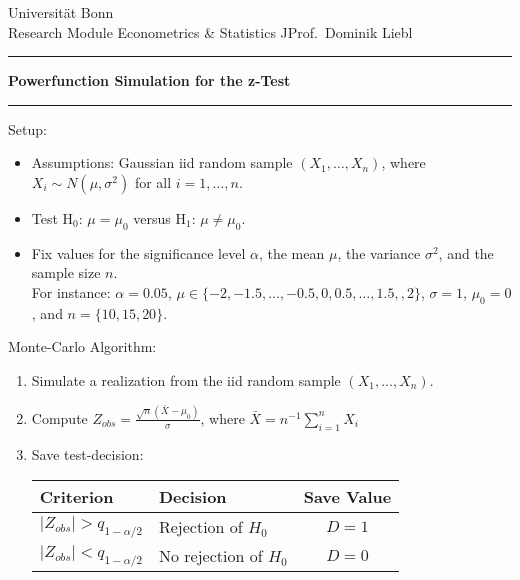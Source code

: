 \documentclass[a4paper]{article}
\begin{document}
Universität Bonn \hfill   \\%
Research Module Econometrics \& Statistics \hfill JProf.~Dominik Liebl
\rule{\textwidth}{.2pt}
\begin{center} 
\textbf{{\large Powerfunction Simulation for the z-Test}}\\[1ex]
\end{center}
\rule{\textwidth}{.2pt}


{\sc Setup: }
\begin{itemize}[leftmargin=0.3cm]
\item Assumptions: Gaussian iid random sample $(X_1,\dots,X_n)$, where $X_i\sim N(\mu,\sigma^2)$ for all $i=1,\dots,n$.
\item Test H$_0$: $\mu=\mu_0$ versus  H$_1$: $\mu\neq\mu_0$.
\item Fix values for the significance level $\alpha$, the mean $\mu$, the variance $\sigma^2$, and the sample size $n$. \\
For instance: $\alpha=0.05$, $\mu\in\{-2,-1.5,\dots,-0.5,0,0.5,\dots,1.5,,2\}$, $\sigma=1$, $\mu_0=0$, and $n=\{10,15,20\}$.
\end{itemize}

{\sc Monte-Carlo Algorithm:}
\begin{enumerate}
\item Simulate a realization from the iid random sample $(X_1,\dots,X_n)$.
\item Compute $Z_{obs}=\frac{\sqrt{n}(\bar{X}-\mu_0)}{\sigma}$, where $\bar{X}=n^{-1}\sum_{i=1}^nX_i$
\item Save test-decision: 
\begin{center}
\begin{tabular}{llc}
Criterion                   & Decision             & Save Value\\ 
\toprule    
$|Z_{obs}|>q_{1-\alpha/2}$ & Rejection of $H_0$   & $D=1$\\
$|Z_{obs}|<q_{1-\alpha/2}$ & No rejection of $H_0$& $D=0$\\   
\bottomrule
\end{tabular}  
\end{center}  
\end{enumerate}
\end{document}
